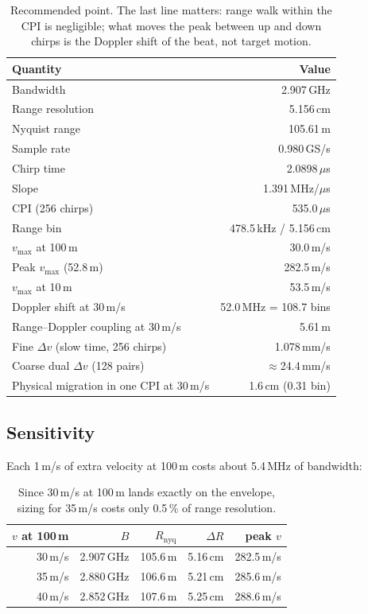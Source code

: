 \documentclass[11pt,a4paper]{article}
\newcommand{\Rnyq}{R_{\mathrm{nyq}}}
\newcommand{\vmax}{v_{\max}}
\newcommand{\dR}{\Delta R}
\begin{document}
\begin{table}[H]
\centering
\small
\begin{tabular}{@{}lr@{}}
\toprule
Quantity & Value \\
\midrule
Bandwidth & 2.907\,GHz \\
Range resolution & 5.156\,cm \\
Nyquist range & 105.61\,m \\
Sample rate & 0.980\,GS/s \\
Chirp time & 2.0898\,$\mu$s \\
Slope & 1.391\,MHz/$\mu$s \\
CPI (256 chirps) & 535.0\,$\mu$s \\
Range bin & 478.5\,kHz / 5.156\,cm \\
$\vmax$ at 100\,m & 30.0\,m/s \\
Peak $\vmax$ (52.8\,m) & 282.5\,m/s \\
$\vmax$ at 10\,m & 53.5\,m/s \\
Doppler shift at 30\,m/s & 52.0\,MHz = 108.7 bins \\
Range--Doppler coupling at 30\,m/s & 5.61\,m \\
Fine $\Delta v$ (slow time, 256 chirps) & 1.078\,mm/s \\
Coarse dual $\Delta v$ (128 pairs) & $\approx$24.4\,mm/s \\
Physical migration in one CPI at 30\,m/s & 1.6\,cm (0.31 bin) \\
\bottomrule
\end{tabular}
\caption{Recommended point. The last line matters: range walk within the CPI is
negligible; what moves the peak between up and down chirps is the Doppler shift
of the beat, not target motion.}
\end{table}

\subsection{Sensitivity}
Each 1\,m/s of extra velocity at 100\,m costs about 5.4\,MHz of bandwidth:

\begin{table}[H]
\centering
\small
\begin{tabular}{@{}rrrrr@{}}
\toprule
$v$ at 100\,m & $B$ & $\Rnyq$ & $\dR$ & peak $v$ \\
\midrule
30\,m/s & 2.907\,GHz & 105.6\,m & 5.16\,cm & 282.5\,m/s \\
35\,m/s & 2.880\,GHz & 106.6\,m & 5.21\,cm & 285.6\,m/s \\
40\,m/s & 2.852\,GHz & 107.6\,m & 5.25\,cm & 288.6\,m/s \\
\bottomrule
\end{tabular}
\caption{Since 30\,m/s at 100\,m lands exactly on the envelope, sizing for
35\,m/s costs only 0.5\,\% of range resolution.}
\end{table}
\end{document}
